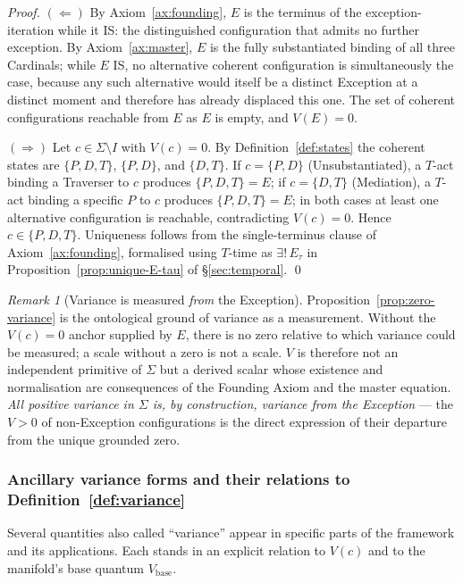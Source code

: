 \documentclass[11pt,a4paper]{article}
\theoremstyle{definition}
\theoremstyle{remark}
\newtheorem{remark}[theorem]{Remark}
\begin{document}
\begin{proof}
$(\Leftarrow)$ By Axiom~\ref{ax:founding}, $E$ is the terminus of the exception-iteration while it IS: the distinguished configuration that admits no further exception. By Axiom~\ref{ax:master}, $E$ is the fully substantiated binding of all three Cardinals; while $E$ IS, no alternative coherent configuration is simultaneously the case, because any such alternative would itself be a distinct Exception at a distinct moment and therefore has already displaced this one. The set of coherent configurations reachable from $E$ as $E$ is empty, and $V(E) = 0$.

$(\Rightarrow)$ Let $c \in \Sigma\setminus I$ with $V(c) = 0$. By Definition~\ref{def:states} the coherent states are $\{P,D,T\}$, $\{P,D\}$, and $\{D,T\}$. If $c = \{P,D\}$ (Unsubstantiated), a $T$-act binding a Traverser to $c$ produces $\{P,D,T\} = E$; if $c = \{D,T\}$ (Mediation), a $T$-act binding a specific $P$ to $c$ produces $\{P,D,T\} = E$; in both cases at least one alternative configuration is reachable, contradicting $V(c)=0$. Hence $c \in \{P,D,T\}$. Uniqueness follows from the single-terminus clause of Axiom~\ref{ax:founding}, formalised using $T$-time as $\exists!\,E_\tau$ in Proposition~\ref{prop:unique-E-tau} of \S\ref{sec:temporal}. \qed
\end{proof}

\begin{remark}[Variance is measured \emph{from} the Exception]\label{rem:variance-from-E}
Proposition~\ref{prop:zero-variance} is the ontological ground of variance as a measurement. Without the $V(c) = 0$ anchor supplied by $E$, there is no zero relative to which variance could be measured; a scale without a zero is not a scale. $V$ is therefore not an independent primitive of $\Sigma$ but a derived scalar whose existence and normalisation are consequences of the Founding Axiom and the master equation. \emph{All positive variance in $\Sigma$ is, by construction, variance from the Exception} --- the $V>0$ of non-Exception configurations is the direct expression of their departure from the unique grounded zero.
\end{remark}

\subsubsection*{Ancillary variance forms and their relations to Definition~\ref{def:variance}}

Several quantities also called ``variance'' appear in specific parts of the framework and its applications. Each stands in an explicit relation to $V(c)$ and to the manifold's base quantum $V_{\text{base}}$.
\end{document}
